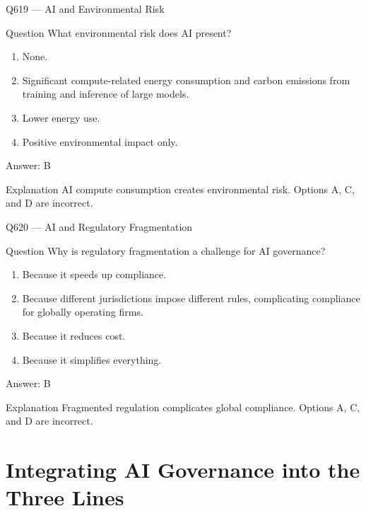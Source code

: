 \documentclass[aspectratio=169,8pt]{beamer}
\begin{document}
	\begin{frame}{Q619 --- AI and Environmental Risk}
		\begin{block}{Question}
			What environmental risk does AI present?
			\begin{enumerate}
				\item None.
				\item Significant compute-related energy consumption and carbon emissions from training and inference of large models.
				\item Lower energy use.
				\item Positive environmental impact only.
			\end{enumerate}
		\end{block}
		\begin{exampleblock}{Answer: B}\end{exampleblock}
		\begin{block}{Explanation}
			AI compute consumption creates environmental risk. Options A, C, and D are incorrect.
		\end{block}
	\end{frame}
	
	\begin{frame}{Q620 --- AI and Regulatory Fragmentation}
		\begin{block}{Question}
			Why is regulatory fragmentation a challenge for AI governance?
			\begin{enumerate}
				\item Because it speeds up compliance.
				\item Because different jurisdictions impose different rules, complicating compliance for globally operating firms.
				\item Because it reduces cost.
				\item Because it simplifies everything.
			\end{enumerate}
		\end{block}
		\begin{exampleblock}{Answer: B}\end{exampleblock}
		\begin{block}{Explanation}
			Fragmented regulation complicates global compliance. Options A, C, and D are incorrect.
		\end{block}
	\end{frame}
	
	\section{Integrating AI Governance into the Three Lines}
	
\end{document}
